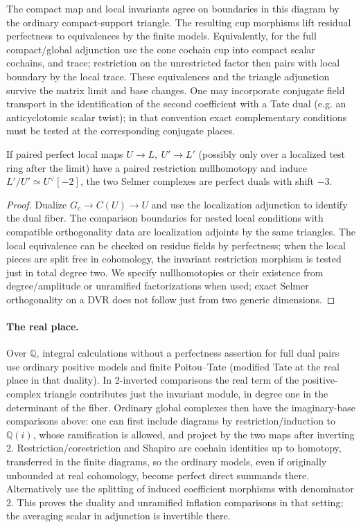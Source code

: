 The compact map and local invariants agree on boundaries in this diagram by the ordinary compact-support triangle. The resulting cup morphisms lift residual perfectness to equivalences by the finite models. Equivalently, for the full compact/global adjunction use the cone cochain cup into compact scalar cochains, and trace; restriction on the unrestricted factor then pairs with local boundary by the local trace. These equivalences and the triangle adjunction survive the matrix limit and base changes. One may incorporate conjugate field transport in the identification of the second coefficient with a Tate dual (e.g. an anticyclotomic scalar twist); in that convention exact complementary conditions must be tested at the corresponding conjugate places.

\begin{lemma}\label{lem:foundations-duality}
If paired perfect local maps \(U\to L,\ U'\to L'\) (possibly only over a localized test ring after the limit) have a paired restriction nullhomotopy and induce \(L'/U'\simeq U^\vee[-2]\), the two Selmer complexes are perfect duals with shift \(-3\). \end{lemma}

\begin{proof}
Dualize \(G_c\to C(U)\to U\) and use the localization adjunction to identify the dual fiber. The comparison boundaries for nested local conditions with compatible orthogonality data are localization adjoints by the same triangles. The local equivalence can be checked on residue fields by perfectness; when the local pieces are split free in cohomology, the invariant restriction morphism is tested just in total degree two. We specify nullhomotopies or their existence from degree/amplitude or unramified factorizations when used; exact Selmer orthogonality on a DVR does not follow just from two generic dimensions.

\end{proof}

\paragraph{The real place.}
Over \(\mathbb Q\), integral calculations without a perfectness assertion for full dual pairs use ordinary positive models and finite Poitou--Tate (modified Tate at the real place in that duality). In 2-inverted comparisons the real term of the positive-complex triangle contributes just the invariant module, in degree one in the determinant of the fiber. Ordinary global complexes then have the imaginary-base comparisons above: one can first include diagrams by restriction/induction to \(\mathbb Q(i)\), whose ramification is allowed, and project by the two maps after inverting 2. Restriction/corestriction and Shapiro are cochain identities up to homotopy, transferred in the finite diagrams, so the ordinary models, even if originally unbounded at real cohomology, become perfect direct summands there. Alternatively use the splitting of induced coefficient morphisms with denominator 2. This proves the duality and unramified inflation comparisons in that setting; the averaging scalar in adjunction is invertible there. 

